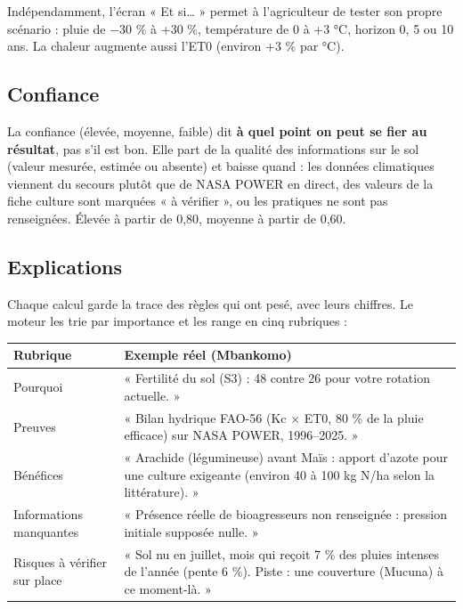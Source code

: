 \documentclass[11pt,a4paper]{article}
\begin{document}
Indépendamment, l'écran « Et si… » permet à l'agriculteur de tester son propre scénario : pluie de −30 \% à
+30 \%, température de 0 à +3 °C, horizon 0, 5 ou 10 ans. La chaleur augmente aussi l'ET0 (environ +3 \% par °C).

\subsection{Confiance}
La confiance (élevée, moyenne, faible) dit \textbf{à quel point on peut se fier au résultat}, pas s'il est bon.
Elle part de la qualité des informations sur le sol (valeur mesurée, estimée ou absente) et baisse quand :
les données climatiques viennent du secours plutôt que de NASA POWER en direct, des valeurs de la fiche culture
sont marquées « à vérifier », ou les pratiques ne sont pas renseignées. Élevée à partir de 0,80, moyenne à partir
de 0,60.

\subsection{Explications}
Chaque calcul garde la trace des règles qui ont pesé, avec leurs chiffres. Le moteur les trie par importance et
les range en cinq rubriques :

\begin{center}
\begin{tabularx}{\textwidth}{L{3.6cm}Y}
\toprule
\textbf{Rubrique} & \textbf{Exemple réel (Mbankomo)} \\
\midrule
Pourquoi & « Fertilité du sol (S3) : 48 contre 26 pour votre rotation actuelle. » \\
Preuves & « Bilan hydrique FAO-56 (Kc × ET0, 80 \% de la pluie efficace) sur NASA POWER, 1996–2025. » \\
Bénéfices & « Arachide (légumineuse) avant Maïs : apport d'azote pour une culture exigeante (environ 40 à 100 kg N/ha selon la littérature). » \\
Informations manquantes & « Présence réelle de bioagresseurs non renseignée : pression initiale supposée nulle. » \\
Risques à vérifier sur place & « Sol nu en juillet, mois qui reçoit 7 \% des pluies intenses de l'année (pente 6 \%). Piste : une couverture (Mucuna) à ce moment-là. » \\
\bottomrule
\end{tabularx}
\end{center}

\end{document}
